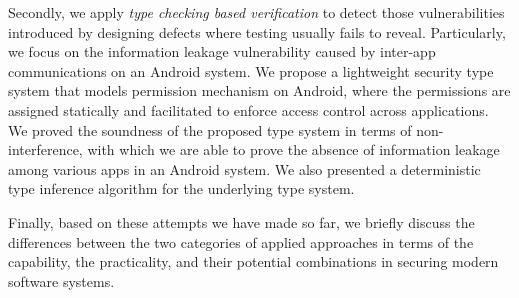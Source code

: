 Secondly, we apply \emph{type checking based verification} to detect those vulnerabilities introduced by designing defects where testing usually fails to reveal. Particularly, we focus on the information leakage vulnerability caused by inter-app communications on an Android system. 
We propose a lightweight security type system that models permission mechanism on Android, where the permissions are assigned statically and facilitated to enforce access control across applications. 
We proved the soundness of the proposed type system in terms of non-interference, with which we are able to prove the absence of information leakage among various apps in an Android system.
We also presented a deterministic type inference algorithm for the underlying type system. 

Finally, based on these attempts we have made so far, we briefly discuss the differences between the two categories of applied approaches in terms of the capability, the practicality, and their potential combinations in securing modern software systems.


